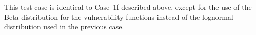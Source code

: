 This test case is identical to Case~1f described above, except for the use of the Beta distribution for the vulnerability functions instead of the lognormal distribution used in the previous case.